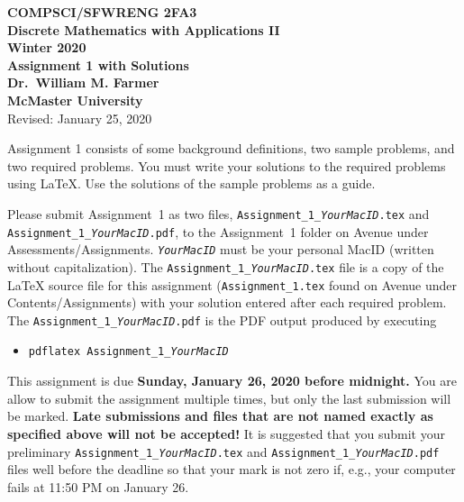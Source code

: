 \documentclass[11pt,fleqn]{article}
\begin{document}
\begin{center}

  {\large \textbf{COMPSCI/SFWRENG 2FA3}}\\[2mm]
  {\large \textbf{Discrete Mathematics with Applications II}}\\[2mm]
  {\large \textbf{Winter 2020}}\\[8mm]
  {\huge \textbf{Assignment 1 with Solutions}}\\[6mm]
  {\large \textbf{Dr.~William M. Farmer}}\\[2mm]
  {\large \textbf{McMaster University}}\\[6mm]
  {\large Revised: January 25, 2020}

\end{center}

\medskip

Assignment 1 consists of some background definitions, two sample
problems, and two required problems.  You must write your solutions to
the required problems using LaTeX.  Use the solutions of the sample
problems as a guide.

Please submit Assignment~1 as two files,
\texttt{Assignment\_1\_\emph{YourMacID}.tex} and
\texttt{Assignment\_1\_\emph{YourMacID}.pdf}, to the Assignment~1
folder on Avenue under Assessments/Assignments.
\texttt{\emph{YourMacID}} must be your personal MacID (written without
capitalization).  The \texttt{Assignment\_1\_\emph{YourMacID}.tex}
file is a copy of the LaTeX source file for this assignment
(\texttt{Assignment\_1.tex} found on Avenue under
Contents/Assignments) with your solution entered after each required
problem.  The \texttt{Assignment\_1\_\emph{YourMacID}.pdf} is the PDF
output produced by executing

\begin{itemize}

  \item[] \texttt{pdflatex Assignment\_1\_\emph{YourMacID}}

\end{itemize}

This assignment is due \textbf{Sunday, January 26, 2020 before
  midnight.}  You are allow to submit the assignment multiple times,
but only the last submission will be marked.  \textbf{Late submissions
  and files that are not named exactly as specified above will not be
  accepted!}  It is suggested that you submit your preliminary
\texttt{Assignment\_1\_\emph{YourMacID}.tex} and
\texttt{Assignment\_1\_\emph{YourMacID}.pdf} files well before the
deadline so that your mark is not zero if, e.g., your computer fails
at 11:50 PM on January 26.
\end{document}
